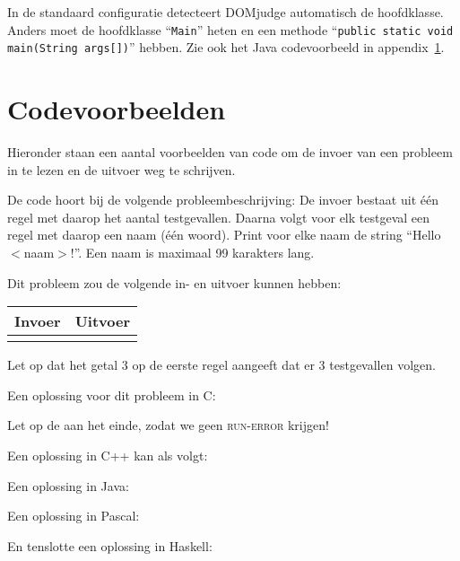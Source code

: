 In de standaard configuratie detecteert DOMjudge automatisch de
hoofdklasse. Anders moet de hoofdklasse ``\verb!Main!'' heten en een
methode ``\verb!public static void main(String args[])!'' hebben. Zie
ook het Java codevoorbeeld in appendix~\ref{codeexamples}.

\newpage
\appendix

\section{Codevoorbeelden}\label{codeexamples}

Hieronder staan een aantal voorbeelden van code om de invoer van een
probleem in te lezen en de uitvoer weg te schrijven.

De code hoort bij de volgende probleembeschrijving: 
De invoer bestaat uit \'e\'en regel met daarop het aantal testgevallen.
Daarna volgt voor elk testgeval een regel met daarop een naam (\'e\'en
woord). Print voor elke naam de string ``Hello $<$naam$>$!''. Een naam
is maximaal 99 karakters lang.

Dit probleem zou de volgende in- en uitvoer kunnen hebben:

\begin{tabular}{|p{}|p{}|}
\hline
\textbf{Invoer} & \textbf{Uitvoer} \\
\hline
 &
 \\
\hline
\end{tabular}

Let op dat het getal 3 op de eerste regel aangeeft dat er 3
testgevallen volgen.

Een oplossing voor dit probleem in C:

Let op de  aan het einde, zodat we geen
\textsc{run-error} krijgen!

\newpage

Een oplossing in C++ kan als volgt:

Een oplossing in Java:

\newpage

Een oplossing in Pascal:

En tenslotte een oplossing in Haskell:



